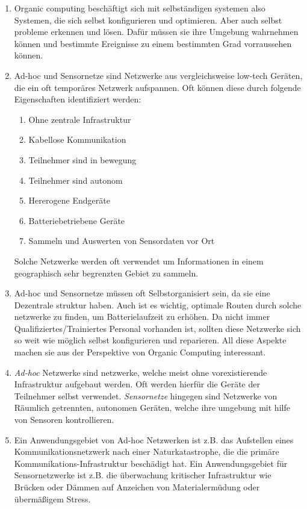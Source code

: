 
\date{Donnerstag 10.05.2020}


    \maketitle
    \thispagestyle{fancy}

    \begin{enumerate}[label=\arabic*)]
        \item Organic computing beschäftigt sich mit selbständigen systemen also Systemen, die sich selbst konfigurieren und optimieren. Aber auch selbst probleme erkennen und lösen. Dafür müssen sie ihre Umgebung wahrnehmen können und bestimmte Ereignisse zu einem bestimmten Grad vorraussehen können. 

        \item Ad-hoc und Sensornetze sind Netzwerke aus vergleichsweise low-tech Geräten, die ein oft temporäres Netzwerk aufspannen. Oft können diese durch folgende Eigenschaften identifiziert werden:
            \begin{enumerate}[label=\alph*)]
                \item Ohne zentrale Infrastruktur
                \item Kabellose Kommunikation
                \item Teilnehmer sind in bewegung
                \item Teilnehmer sind autonom
                \item Hererogene Endgeräte
                \item Batteriebetriebene Geräte
                \item Sammeln und Auswerten von Sensordaten vor Ort
            \end{enumerate}
        Solche Netzwerke werden oft verwendet um Informationen in einem geographisch sehr begrenzten Gebiet zu sammeln. 
        \item Ad-hoc und Sensornetze müssen oft Selbstorganisiert sein, da sie eine Dezentrale struktur haben. Auch ist es wichtig, optimale Routen durch solche netzwerke zu finden, um Batterielaufzeit zu erhöhen. Da nicht immer Qualifiziertes/Trainiertes Personal vorhanden ist, sollten diese Netzwerke sich so weit wie möglich selbst konfigurieren und reparieren. All diese Aspekte machen sie aus der Perspektive von Organic Computing interessant.
        \item \emph{Ad-hoc} Netzwerke sind netzwerke, welche meist ohne vorexistierende Infrastruktur aufgebaut werden. Oft werden hierfür die Geräte der Teilnehmer selbst verwendet. \emph{Sensornetze} hingegen sind Netzwerke von Räumlich getrennten, autonomen Geräten, welche ihre umgebung mit hilfe von Sensoren kontrollieren. 
        \item Ein Anwendungsgebiet von Ad-hoc Netzwerken ist z.B. das Aufstellen eines Kommunikationsnetzwerk nach einer Naturkatastrophe, die die primäre Kommunikations-Infrastruktur beschädigt hat. Ein Anwendungsgebiet für Sensornetzwerke ist z.B. die überwachung kritischer Infrastruktur wie Brücken oder Dämmen auf Anzeichen von Materialermüdung oder übermäßigem Stress.
    \end{enumerate}

